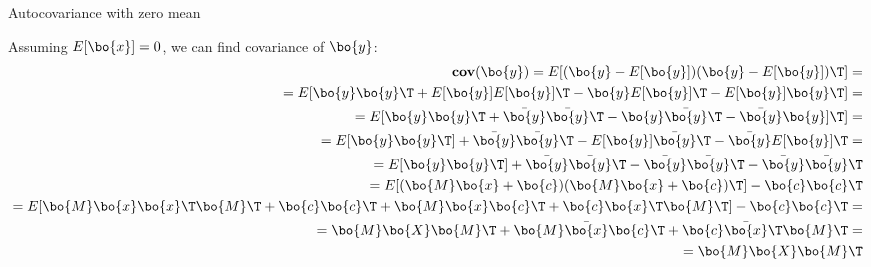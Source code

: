\documentclass{beamer}
\begin{document}
\begin{frame}{Autocovariance with zero mean}
	\begin{flushleft}
		
		Assuming $E[\bo{x}] = 0$, we can find covariance of $\bo{y}$:
		\begin{align*}
			\textbf{cov}(\bo{y}) = E[(\bo{y} - E[\bo{y}])(\bo{y} - E[\bo{y}])\T] =
			\\
			= E[\bo{y}\bo{y}\T
			+ E[\bo{y}]E[\bo{y}]\T
			- \bo{y}E[\bo{y}]\T
			- E[\bo{y}]\bo{y}\T] =
			\\
			=
			E[\bo{y}\bo{y}\T
			+ \bar{\bo{y}}\bar{\bo{y}}\T
			- \bo{y}\bar{\bo{y}}\T
			- \bar{\bo{y}}\bo{y}]\T]=
			\\
			=
			E[\bo{y}\bo{y}\T]
			+ \bar{\bo{y}}\bar{\bo{y}}\T
			- E[\bo{y}]\bar{\bo{y}}\T
			- \bar{\bo{y}}E[\bo{y}]\T=
			\\
			=
			E[\bo{y}\bo{y}\T]
			+ \bar{\bo{y}}\bar{\bo{y}}\T
			- \bar{\bo{y}}\bar{\bo{y}}\T
			- \bar{\bo{y}}\bar{\bo{y}}\T
			\\
			=
			E[(\bo{M}\bo{x} + \bo{c})(\bo{M}\bo{x} + \bo{c})\T]
			- \bo{c}\bo{c}\T
			\\
			=
			E[\bo{M}\bo{x}\bo{x}\T \bo{M}\T+
			\bo{c}\bo{c}\T+
			\bo{M}\bo{x}\bo{c}\T+
			\bo{c}\bo{x}\T \bo{M}\T]
			- \bo{c}\bo{c}\T=
			\\
			=
			\bo{M}\bo{X} \bo{M}\T+
			\bo{M}\bar{\bo{x}}\bo{c}\T+
			\bo{c}\bar{\bo{x}}\T \bo{M}\T=
			\\
			=
			\bo{M}\bo{X} \bo{M}\T
		\end{align*}
		
	\end{flushleft}
\end{frame}
\end{document}
